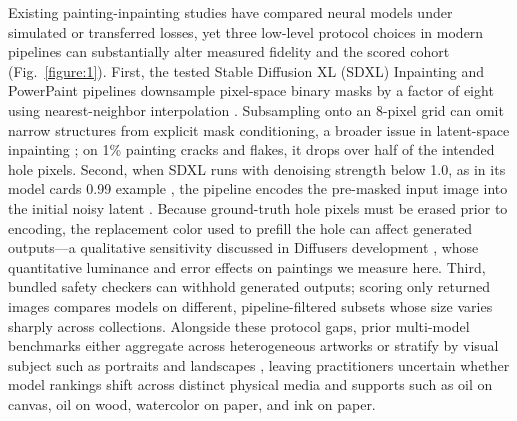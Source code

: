 \documentclass[fleqn,12pt,lineno]{wlpeerj}
\begin{document}
Existing painting-inpainting studies have compared neural models under simulated or transferred losses, yet three low-level protocol choices in modern pipelines can substantially alter measured fidelity and the scored cohort (Fig.~\ref{figure:1}). First, the tested Stable Diffusion XL (SDXL) Inpainting and PowerPaint pipelines downsample pixel-space binary masks by a factor of eight using nearest-neighbor interpolation \citep{diffuserssdxl0352, powerpaintv1src}. Subsampling onto an 8-pixel grid can omit narrow structures from explicit mask conditioning, a broader issue in latent-space inpainting \citep{shamsolmoali2025tdpaint}; on 1\% painting cracks and flakes, it drops over half of the intended hole pixels. Second, when SDXL runs with denoising strength below 1.0, as in its model card\textquotesingle s 0.99 example \citep{sdxlinpaint}, the pipeline encodes the pre-masked input image into the initial noisy latent \citep{diffuserssdxl0352}. Because ground-truth hole pixels must be erased prior to encoding, the replacement color used to prefill the hole can affect generated outputs---a qualitative sensitivity discussed in Diffusers development \citep{diffusers8450}, whose quantitative luminance and error effects on paintings we measure here. Third, bundled safety checkers can withhold generated outputs; scoring only returned images compares models on different, pipeline-filtered subsets whose size varies sharply across collections. Alongside these protocol gaps, prior multi-model benchmarks either aggregate across heterogeneous artworks \citep{hu2025imagest} or stratify by visual subject such as portraits and landscapes \citep{controlled300}, leaving practitioners uncertain whether model rankings shift across distinct physical media and supports such as oil on canvas, oil on wood, watercolor on paper, and ink on paper.
\end{document}

